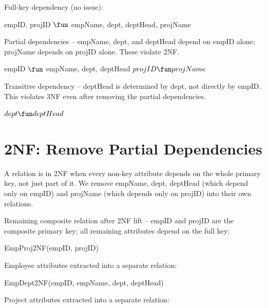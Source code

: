 \documentclass[a4paper,10pt,fleqn]{article}
\begin{document}
\bigskip

\noindent Full-key dependency (no issue):

\bigskip

\noindent empID, projID $\fun$ empName, dept, deptHead, projName

\bigskip

\noindent Partial dependencies -- empName, dept, and deptHead depend on empID alone; projName depends on projID alone.  These violate 2NF.

\bigskip

\noindent empID $\fun$ empName, dept, deptHead $projID \fun projName$

\bigskip

\noindent Transitive dependency -- deptHead is determined by dept, not directly by empID.  This violates 3NF even after removing the partial dependencies.

\bigskip

\noindent $dept \fun deptHead$

\bigskip

\medskip

\section*{2NF: Remove Partial Dependencies}

\noindent A relation is in 2NF when every non-key attribute depends on the whole primary key, not just part of it.  We remove empName, dept, deptHead (which depend only on empID) and projName (which depends only on projID) into their own relations.

\bigskip

\noindent Remaining composite relation after 2NF lift -- empID and projID are the composite primary key; all remaining attributes depend on the full key:

\bigskip

\noindent EmpProj2NF(empID, projID)

\bigskip

\noindent Employee attributes extracted into a separate relation:

\bigskip

\noindent EmpDept2NF(empID, empName, dept, deptHead)

\bigskip

\noindent Project attributes extracted into a separate relation:

\bigskip
\end{document}
